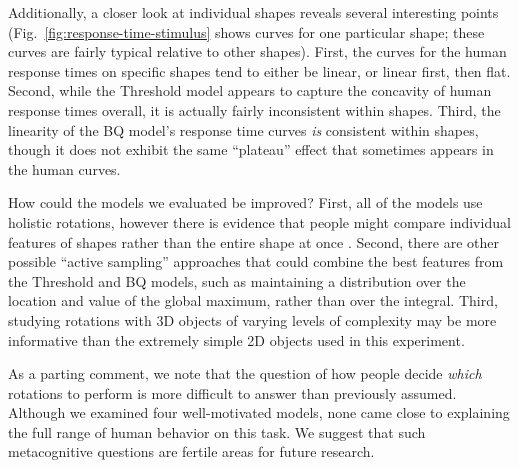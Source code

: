 \documentclass[10pt,letterpaper]{article}
\newcommand{\Th}[0]{Threshold}
\newcommand{\Bq}[0]{BQ}
\begin{document}
Additionally, a closer look at individual shapes reveals several
interesting points (Fig.~\ref{fig:response-time-stimulus} shows curves
for one particular shape; these curves are fairly typical relative to
other shapes). First, the curves for the human response times on
specific shapes tend to either be linear, or linear first, then
flat. Second, while the \Th{} model appears to capture the concavity
of human response times overall, it is actually fairly inconsistent
within shapes. Third, the linearity of the \Bq{} model's response time
curves \textit{is} consistent within shapes, though it does not
exhibit the same ``plateau'' effect that sometimes appears in the
human curves.

How could the models we evaluated be improved? First, all of the
models use holistic rotations, however there is evidence that people
might compare individual features of shapes rather than the entire
shape at once \cite{Just1976,Yuille:1982tx}. Second, there are other
possible ``active sampling'' approaches that could combine the best
features from the \Th{} and \Bq{} models, such as maintaining a
distribution over the location and value of the global maximum, rather
than over the integral. Third, studying rotations with 3D objects of
varying levels of complexity may be more informative than the
extremely simple 2D objects used in this experiment.

As a parting comment, we note that the question of how people decide
\textit{which} rotations to perform is more difficult to answer than
previously assumed. Although we examined four well-motivated models,
none came close to explaining the full range of human behavior on this
task. We suggest that such metacognitive questions are fertile areas
for future research.




\renewcommand{\bibliographytypesize}{\small}
\setlength{\bibleftmargin}{.125in}
\setlength{\bibindent}{-\bibleftmargin}

\end{document}
